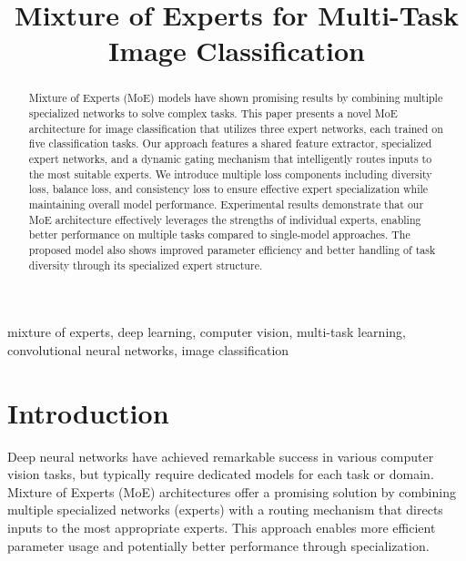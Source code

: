 \documentclass[conference]{IEEEtran}
\begin{document}
\title{Mixture of Experts for Multi-Task Image Classification}

\author{
}

\maketitle

\begin{abstract}
Mixture of Experts (MoE) models have shown promising results by combining multiple specialized networks to solve complex tasks. This paper presents a novel MoE architecture for image classification that utilizes three expert networks, each trained on five classification tasks. Our approach features a shared feature extractor, specialized expert networks, and a dynamic gating mechanism that intelligently routes inputs to the most suitable experts. We introduce multiple loss components including diversity loss, balance loss, and consistency loss to ensure effective expert specialization while maintaining overall model performance. Experimental results demonstrate that our MoE architecture effectively leverages the strengths of individual experts, enabling better performance on multiple tasks compared to single-model approaches. The proposed model also shows improved parameter efficiency and better handling of task diversity through its specialized expert structure.
\end{abstract}

\begin{IEEEkeywords}
mixture of experts, deep learning, computer vision, multi-task learning, convolutional neural networks, image classification
\end{IEEEkeywords}

\section{Introduction}
Deep neural networks have achieved remarkable success in various computer vision tasks, but typically require dedicated models for each task or domain. Mixture of Experts (MoE) architectures offer a promising solution by combining multiple specialized networks (experts) with a routing mechanism that directs inputs to the most appropriate experts. This approach enables more efficient parameter usage and potentially better performance through specialization.
\end{document}
